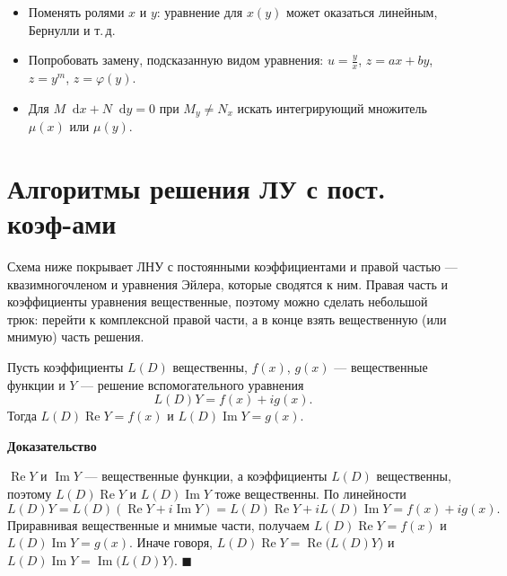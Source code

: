 \documentclass[12pt,a4paper]{article}
\numberwithin{equation}{section}
\renewcommand{\Re}{\operatorname{Re}}
\renewcommand{\Im}{\operatorname{Im}}
\newcommand{\dd}{\mathop{}\!\mathrm{d}}
\renewenvironment{proof}[1][Доказательство]{\begin{center}\textbf{#1}\end{center}}{\hfill$\blacksquare$\par}
\begin{document}
\begin{remarkHSE}
\begin{itemize}
  \item Поменять ролями $x$ и $y$: уравнение для $x(y)$ может оказаться линейным, Бернулли и т.\,д.
  \item Попробовать замену, подсказанную видом уравнения: $u=\frac yx$, $z=ax+by$, $z=y^m$, $z=\varphi(y)$.
  \item Для $M\dd x+N\dd y=0$ при $M_y\neq N_x$ искать интегрирующий множитель $\mu(x)$ или $\mu(y)$.
\end{itemize}
\end{remarkHSE}

\section{Алгоритмы решения ЛУ с пост. коэф-ами}
\label{sec:lu-const-scheme}
Схема ниже покрывает ЛНУ с постоянными коэффициентами и правой частью --- квазимногочленом и уравнения Эйлера, которые сводятся к ним. Правая часть и коэффициенты уравнения вещественные, поэтому можно сделать небольшой трюк: перейти к комплексной правой части, а в конце взять вещественную (или мнимую) часть решения.

\begin{lemmaHSE}
Пусть коэффициенты \(L(D)\) вещественны, \(f(x)\), \(g(x)\) --- вещественные функции и \(Y\) --- решение вспомогательного уравнения
\[
L(D)Y=f(x)+ig(x).
\]
Тогда \(L(D)\Re Y=f(x)\) и \(L(D)\Im Y=g(x)\).
\end{lemmaHSE}

\begin{proof}
\(\Re Y\) и \(\Im Y\) --- вещественные функции, а коэффициенты \(L(D)\) вещественны, поэтому \(L(D)\Re Y\) и \(L(D)\Im Y\) тоже вещественны. По линейности
\[
L(D)Y=L(D)(\Re Y+i\Im Y)=L(D)\Re Y+iL(D)\Im Y=f(x)+ig(x).
\]
Приравнивая вещественные и мнимые части, получаем \(L(D)\Re Y=f(x)\) и \(L(D)\Im Y=g(x)\). Иначе говоря, \(\boxed{L(D)\Re Y=\Re\bigl(L(D)Y\bigr)}\) и \(L(D)\Im Y=\Im\bigl(L(D)Y\bigr)\).
\end{proof}
\end{document}

